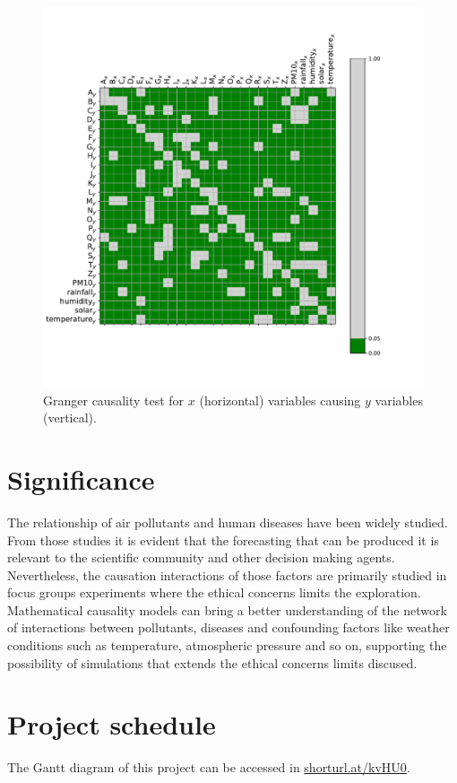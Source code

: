 \documentclass[
  11pt,
  a4paper,
  oneside
]{article}
\begin{document}
\begin{figure}
    \includegraphics[trim={0 0 0 4em}, clip, width=1\textwidth]{figs/2018_granger.pdf}
    \caption{Granger causality test for $x$ (horizontal) variables causing $y$ variables (vertical).}
    \label{fig:granger_test}
\end{figure}

\section{Significance}
The relationship of air pollutants and human diseases have been widely studied. From those studies it is evident that the forecasting that can be produced it is relevant to the scientific community and other decision making agents. Nevertheless, the causation interactions of those factors are primarily studied in focus groups experiments where the ethical concerns limits the exploration. Mathematical causality models can bring a better understanding of the network of interactions between pollutants, diseases and confounding factors like weather conditions such as temperature, atmospheric pressure and so on, supporting the possibility of simulations that extends the ethical concerns limits discused.

\section{Project schedule}
The Gantt diagram of this project can be accessed in \url{shorturl.at/kvHU0}.



\end{document}
